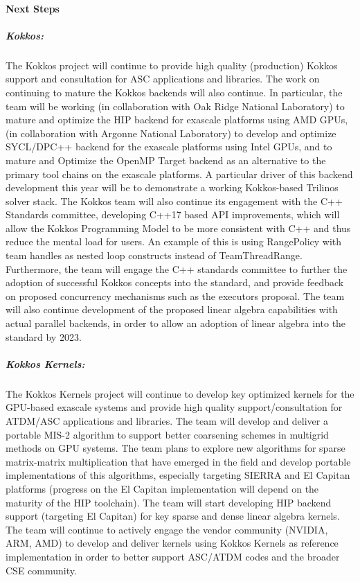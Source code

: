 \paragraph{Next Steps}


\subparagraph{Kokkos: } The Kokkos project will continue to provide high quality (production) Kokkos support and consultation for ASC applications and libraries. The work on continuing to mature the Kokkos backends will also continue.  In particular, the team will be working (in collaboration with Oak Ridge National Laboratory) to mature and optimize the HIP backend for exascale platforms using AMD GPUs, (in collaboration with Argonne National Laboratory) to develop and optimize SYCL/DPC++ backend for the exascale platforms using Intel GPUs, and to mature and Optimize the OpenMP Target backend as an alternative to the primary tool chains on the exascale platforms. A particular driver of this backend development this year will be to demonstrate a working Kokkos-based Trilinos solver stack.  The Kokkos team will also continue its engagement with the C++ Standards committee, developing C++17 based API improvements, which will allow the Kokkos Programming Model to be more consistent with C++ and thus reduce the mental load for users.   An example of this is using RangePolicy with team handles as nested loop constructs instead of TeamThreadRange. Furthermore, the team will engage the C++ standards committee to further the adoption of successful Kokkos concepts into the standard, and provide feedback on proposed concurrency mechanisms such as the executors proposal. The team will also continue development of the proposed linear algebra capabilities with actual parallel backends, in order to allow an adoption of linear algebra into the standard by 2023.

\subparagraph{Kokkos Kernels:} The Kokkos Kernels project will continue to develop key optimized kernels for the GPU-based exascale systems and provide high quality support/consultation for ATDM/ASC applications and libraries.  The team will develop and deliver a portable MIS-2 algorithm to support better coarsening schemes in multigrid methods on GPU systems.  The team plans to explore new algorithms for sparse matrix-matrix multiplication that have emerged in the field and develop portable implementations of this algorithms, especially targeting SIERRA and El Capitan platforms (progress on the El Capitan implementation will depend on the maturity of the HIP toolchain).  The team will start developing HIP backend support (targeting El Capitan) for key sparse and dense linear algebra kernels.  The team will continue to actively engage the vendor community (NVIDIA, ARM, AMD) to develop and deliver kernels using Kokkos Kernels as reference implementation in order to better support ASC/ATDM codes and the broader CSE community.
 
